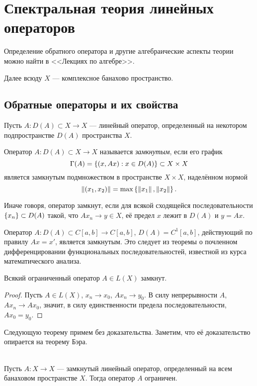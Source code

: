 \section{Спектральная теория линейных операторов}
Определение обратного оператора и другие алгебраические аспекты теории можно найти
в <<Лекциях по алгебре>>.

Далее всюду $X$ --- комплексное банахово пространство.

\subsection{Обратные операторы и их свойства}
Пусть $A \colon D(A) \subset X \to X$ --- линейный оператор, определенный на некотором
подпространстве $D(A)$ пространства $X$.

\begin{definition}
    Оператор $A \colon D(A) \subset X \to X$ называется \emph{замкнутым}, если его график
    \[ \Gamma(A) = \left\{(x, Ax) : x \in D(A)\right\} \subset X \times X \]
    является замкнутым подмножеством в пространстве $X \times X$, наделённом нормой
    \[ \left\|(x_1, x_2)\right\| = \max\left\{\left\|x_1\right\|, \left\|x_2\right\|\right\}. \]
\end{definition}

Иначе говоря, оператор замкнут, 
если для всякой сходящейся последовательности $\left\{x_n\right\} \subset D(A)$ такой, что
$Ax_n \to y \in X$, её предел $x$ лежит в $D(A)$ и $y = Ax$.

\begin{example}
    Оператор $A \colon D(A) \subset C[a,b] \to C[a,b]$, $D(A) = C^1[a,b]$, действующий по правилу
    $Ax = x'$, является замкнутым. Это следует из теоремы о почленном дифференцировании
    функциональных последовательностей, известной из курса математического анализа.
\end{example}

\begin{theorem}
    Всякий ограниченный оператор $A \in L(X)$ замкнут.
\end{theorem}

\begin{proof}
    Пусть $A \in L(X)$, $x_n \to x_0$, $Ax_n \to y_0$. В силу непрерывности $A$, $Ax_n \to Ax_0$, значит, в силу единственности предела последовательности, $Ax_0 = y_0$.
\end{proof}

Следующую теорему примем без доказательства. Заметим, что её доказательство опирается
на теорему Бэра.
\begin{theorem}\hfill\\
    \indent Пусть $A \colon X \to X$ --- замкнутый линейный оператор, определенный на всем
    банаховом пространстве $X$. Тогда оператор $A$ ограничен.
\end{theorem}

